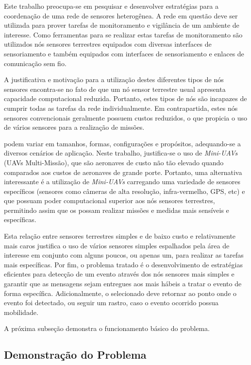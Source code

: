 Este trabalho preocupa-se em pesquisar e desenvolver estratégias para a coordenação de uma rede de sensores heterogênea. A rede em questão deve ser utilizada para prover tarefas de monitoramento e vigilância de um ambiente de interesse. Como ferramentas para se realizar estas tarefas de monitoramento são utilizados nós sensores terrestres equipados com diversas interfaces de sensoriamento e \vants também equipados com interfaces de sensoriamento e enlaces de comunicação sem fio.

A justificativa e motivação para a utilização destes diferentes tipos de nós sensores encontra-se no fato de que um nó sensor terrestre usual apresenta capacidade computacional reduzida. Portanto, estes tipos de nós são incapazes de cumprir todas as tarefas da rede individualmente. Em contrapartida, estes nós sensores convencionais geralmente possuem custos reduzidos, o que propicia o uso de vários sensores para a realização de missões. 

\uavs podem variar em tamanhos, formas, configurações e propósitos, adequando-se a diversos cenários de aplicação. Neste trabalho, justifica-se o uso de \emph{Mini-UAVs} (UAVs Multi-Missão), que são aeronaves de custo não tão elevado quando comparados aos custos de aeronaves de grande porte. Portanto, uma alternativa interessante é a utilização de \emph{Mini-UAVs} carregando uma variedade de sensores específicos (sensores como câmeras de alta resolução, infra-vermelho, GPS, etc) e que possuam poder computacional superior aos nós sensores terrestres, permitindo assim que os \vants possam realizar missões e medidas mais sensíveis e específicas.

Esta relação entre sensores terrestres simples e de baixo custo e \vants relativamente mais caros justifica o uso de vários sensores simples espalhados pela área de interesse em conjunto com alguns poucos, ou apenas um, \vant para realizar as tarefas mais específicas. Por fim, o problema tratado é o desenvolvimento de estratégias eficientes para detecção de um evento através dos nós sensores mais simples e garantir que as mensagens sejam entregues aos \vants mais hábeis a tratar o evento de forma específica. Adicionalmente, o \vant selecionado deve retornar ao ponto onde o evento foi detectado, ou seguir um rastro, caso o evento ocorrido possua mobilidade.

A próxima subseção demonstra o funcionamento básico do problema.

\subsection{Demonstração do Problema}

